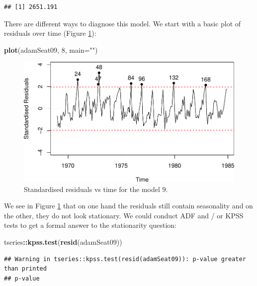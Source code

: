 \documentclass[]{book}
\newenvironment{Shaded}{\begin{snugshade}}{\end{snugshade}}
\newcommand{\DataTypeTok}[1]{\textcolor[rgb]{0.13,0.29,0.53}{#1}}
\newcommand{\DecValTok}[1]{\textcolor[rgb]{0.00,0.00,0.81}{#1}}
\newcommand{\KeywordTok}[1]{\textcolor[rgb]{0.13,0.29,0.53}{\textbf{#1}}}
\newcommand{\NormalTok}[1]{#1}
\newcommand{\OperatorTok}[1]{\textcolor[rgb]{0.81,0.36,0.00}{\textbf{#1}}}
\newcommand{\StringTok}[1]{\textcolor[rgb]{0.31,0.60,0.02}{#1}}
\theoremstyle{definition}
\theoremstyle{definition}
\theoremstyle{definition}
\theoremstyle{definition}
\theoremstyle{remark}
\begin{document}
\begin{verbatim}
## [1] 2651.191
\end{verbatim}

There are different ways to diagnose this model. We start with a basic plot of residuals over time (Figure \ref{fig:adamSeat09ResidvsTime}):

\begin{Shaded}
\begin{Highlighting}[]
\KeywordTok{plot}\NormalTok{(adamSeat09, }\DecValTok{8}\NormalTok{, }\DataTypeTok{main=}\StringTok{""}\NormalTok{)}
\end{Highlighting}
\end{Shaded}

\begin{figure}
\centering
\includegraphics{Svetunkov--2022----ADAM_files/figure-latex/adamSeat09ResidvsTime-1.pdf}
\caption{\label{fig:adamSeat09ResidvsTime}Standardised residuals vs time for the model 9.}
\end{figure}

We see in Figure \ref{fig:adamSeat09ResidvsTime} that on one hand the residuals still contain seasonality and on the other, they do not look stationary. We could conduct ADF and / or KPSS tests \citep[which will be discussed in one of the later Chapters of][]{SvetunkovSBA} to get a formal answer to the stationarity question:

\begin{Shaded}
\begin{Highlighting}[]
\NormalTok{tseries}\OperatorTok{::}\KeywordTok{kpss.test}\NormalTok{(}\KeywordTok{resid}\NormalTok{(adamSeat09))}
\end{Highlighting}
\end{Shaded}

\begin{verbatim}
## Warning in tseries::kpss.test(resid(adamSeat09)): p-value greater than printed
## p-value
\end{verbatim}
\end{document}
